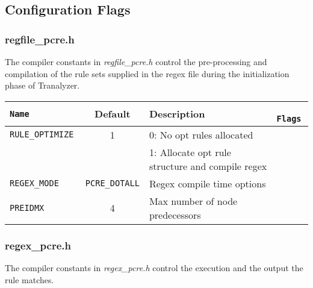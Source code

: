 \documentclass[documentation]{subfiles}
\begin{document}
\subsection{Configuration Flags}

\subsubsection{regfile\_pcre.h}
The compiler constants in {\em regfile\_pcre.h} control the pre-processing and
compilation of the rule sets supplied in the regex file during the initialization phase of Tranalyzer.

\begin{longtable}{>{\tt}lcl>{\tt\small}l}
    \toprule
    {\bf Name}     & {\bf Default}            & {\bf Description}                                & {\bf Flags}\\
    \midrule\endhead%
    RULE\_OPTIMIZE & 1                        & 0: No opt rules allocated                        & \\
                   &                          & 1: Allocate opt rule structure and compile regex & \\
    REGEX\_MODE    & {\tt\small PCRE\_DOTALL} & Regex compile time options                       & \\
    PREIDMX        & 4                        & Max number of node predecessors                  & \\
    \bottomrule
\end{longtable}

\subsubsection{regex\_pcre.h}
The compiler constants in {\em regex\_pcre.h} control the execution and
the output the rule matches.
\end{document}
